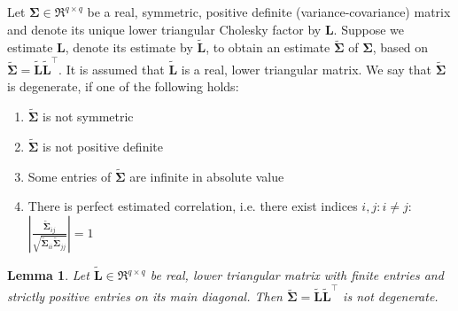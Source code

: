\documentclass[11pt, a4paper]{article}
\newcommand*{\bb}{\boldsymbol}
\theoremstyle{example} \newtheorem{example}{Example}[section]
\theoremstyle{theorem} \newtheorem{theorem}{Theorem}[section]
\theoremstyle{theorem }\newtheorem{proposition}{Proposition}[section]
\theoremstyle{theorem }\newtheorem{corollary}{Corollary}[section]
\newtheorem{lemma}[theorem]{Lemma}
\begin{document}
Let $\bb \Sigma \in \Re^{q \times q}$ be a real, symmetric, positive definite (variance-covariance) matrix and denote its unique lower triangular Cholesky factor by $\bb L$. Suppose we estimate $\bb L$, denote its estimate by $\tilde{\bb L}$, to obtain an estimate $\tilde{\bb \Sigma}$ of $\bb \Sigma$, based on $\tilde{\bb \Sigma} = \tilde{\bb L}\tilde{\bb L}^\top$. It is assumed that $\tilde{\bb L}$ is a real, lower triangular matrix. We say that $\tilde{\bb \Sigma}$ is degenerate, if one of the following holds: 
\begin{enumerate}[label=S\arabic{*})]
	\item $\tilde{\bb \Sigma}$ is not symmetric
	\item $\tilde{\bb \Sigma}$ is not positive definite 
	\item Some entries of $\tilde{\bb \Sigma}$ are infinite in absolute value 
	\item There is perfect estimated correlation, i.e. there exist indices $i,j: i \neq j$: $\left|\frac{\tilde{\bb \Sigma}_{ij} }{\sqrt{ \tilde{\bb \Sigma}_{ii} \tilde{\bb \Sigma}_{jj}}}\right|=1$ 
\end{enumerate}
\begin{lemma} \label{lemma:nondeg}
	Let $\tilde{\bb L} \in \Re^{q \times q}$ be real, lower triangular matrix with finite entries and strictly positive entries on its main diagonal. Then $\tilde{\bb \Sigma} = \tilde{\bb L}\tilde{\bb L}^\top$ is not degenerate. 
\end{lemma}
\end{document}
